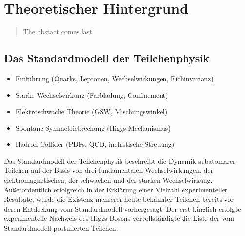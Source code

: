 


\chapter{Theoretischer Hintergrund}

\begin{quote}
    The abstact comes last
\end{quote}



\section{Das Standardmodell der Teilchenphysik}
\label{theory:standardmodell}

\begin{itemize}
    \item Einführung (Quarks, Leptonen, Wechselwirkungen, Eichinvarianz)
    \item Starke Wechselwirkung (Farbladung, Confinement)
    \item Elektroschwache Theorie (GSW, Mischungswinkel)
    \item Spontane-Symmetriebrechung (Higgs-Mechanismus)
    \item Hadron-Collider (PDFs, QCD, inelastische Streuung)
\end{itemize}

Das Standardmodell der Teilchenphysik beschreibt die Dynamik subatomarer
Teilchen auf der Basis von drei fundamentalen Wechselwirkungen, der
elektromagnetischen, der schwachen und der starken Wechselwirkung.
Außerordentlich erfolgreich in der Erklärung einer Vielzahl experimenteller
Resultate, wurde die Existenz mehrerer heute bekannter Teilchen bereits vor
deren Entdeckung vom Standardmodell vorhergesagt. Der erst kürzlich erfolgte
experimentelle Nachweis des Higgs-Bosons vervollständigte die Liste der vom
Standardmodell postulierten Teilchen.

